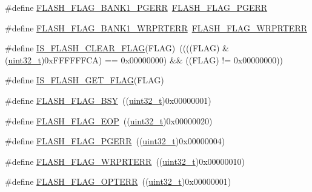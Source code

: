 \begin{DoxyCompactItemize}
\#define \hyperlink{group___f_l_a_s_h___flags_gaa1056ffdd1c434a2967d5ed7c0d263be}{F\+L\+A\+S\+H\+\_\+\+F\+L\+A\+G\+\_\+\+B\+A\+N\+K1\+\_\+\+P\+G\+E\+RR}~\hyperlink{group___f_l_a_s_h___flags_gae2ef62dee0a5ca01e6226746039b6f20}{F\+L\+A\+S\+H\+\_\+\+F\+L\+A\+G\+\_\+\+P\+G\+E\+RR}
\item 
\#define \hyperlink{group___f_l_a_s_h___flags_ga1646345adbcda773ef25785b1bdc4c43}{F\+L\+A\+S\+H\+\_\+\+F\+L\+A\+G\+\_\+\+B\+A\+N\+K1\+\_\+\+W\+R\+P\+R\+T\+E\+RR}~\hyperlink{group___f_l_a_s_h___flags_ga5c59a7f07507cac38091275964d3d35d}{F\+L\+A\+S\+H\+\_\+\+F\+L\+A\+G\+\_\+\+W\+R\+P\+R\+T\+E\+RR}
\item 
\#define \hyperlink{group___f_l_a_s_h___flags_ga82f8c6104c348d6aa47c7658ed3b6b36}{I\+S\+\_\+\+F\+L\+A\+S\+H\+\_\+\+C\+L\+E\+A\+R\+\_\+\+F\+L\+AG}(F\+L\+AG)~((((F\+L\+AG) \& (\hyperlink{_p_e___types_8h_a33594304e786b158f3fb30289278f5af}{uint32\+\_\+t})0x\+F\+F\+F\+F\+F\+F\+C\+A) == 0x00000000) \&\& ((\+F\+L\+A\+G) != 0x00000000))
\item 
\#define \hyperlink{group___f_l_a_s_h___flags_ga61b60325cd94e1608e34afc7aff20ee4}{I\+S\+\_\+\+F\+L\+A\+S\+H\+\_\+\+G\+E\+T\+\_\+\+F\+L\+AG}(F\+L\+AG)
\item 
\#define \hyperlink{group___f_l_a_s_h___flags_gad3bc368f954ad7744deda3315da2fff7}{F\+L\+A\+S\+H\+\_\+\+F\+L\+A\+G\+\_\+\+B\+SY}~((\hyperlink{_p_e___types_8h_a33594304e786b158f3fb30289278f5af}{uint32\+\_\+t})0x00000001)
\item 
\#define \hyperlink{group___f_l_a_s_h___flags_gaf043ba4d8f837350bfc7754a99fae5a9}{F\+L\+A\+S\+H\+\_\+\+F\+L\+A\+G\+\_\+\+E\+OP}~((\hyperlink{_p_e___types_8h_a33594304e786b158f3fb30289278f5af}{uint32\+\_\+t})0x00000020)
\item 
\#define \hyperlink{group___f_l_a_s_h___flags_gae2ef62dee0a5ca01e6226746039b6f20}{F\+L\+A\+S\+H\+\_\+\+F\+L\+A\+G\+\_\+\+P\+G\+E\+RR}~((\hyperlink{_p_e___types_8h_a33594304e786b158f3fb30289278f5af}{uint32\+\_\+t})0x00000004)
\item 
\#define \hyperlink{group___f_l_a_s_h___flags_ga5c59a7f07507cac38091275964d3d35d}{F\+L\+A\+S\+H\+\_\+\+F\+L\+A\+G\+\_\+\+W\+R\+P\+R\+T\+E\+RR}~((\hyperlink{_p_e___types_8h_a33594304e786b158f3fb30289278f5af}{uint32\+\_\+t})0x00000010)
\item 
\#define \hyperlink{group___f_l_a_s_h___flags_gac36b0605df97c9414933369a32251e4a}{F\+L\+A\+S\+H\+\_\+\+F\+L\+A\+G\+\_\+\+O\+P\+T\+E\+RR}~((\hyperlink{_p_e___types_8h_a33594304e786b158f3fb30289278f5af}{uint32\+\_\+t})0x00000001)
\item 

\end{DoxyCompactItemize}
